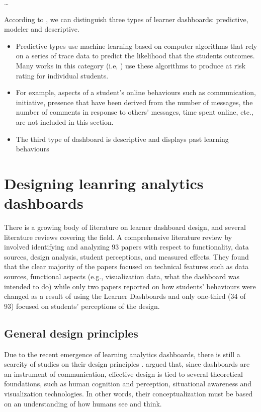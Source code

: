 \documentclass[preprint,12pt]{elsarticle}
\begin{document}
\dots


According to \citet{bennett2019four}, we can distinguish  three types of learner dashboards: predictive, modeler and descriptive. 
\begin{itemize}
    \item Predictive types use machine learning based on computer algorithms that rely on a series of trace data to predict the likelihood that the students outcomes. Many works in this category (i.e, \citep{arnold2014exercise}) use these algorithms to produce at risk rating for individual students.
    \item For example, aspects of a student's online behaviours such as communication, initiative, presence that have been derived from the number of messages, the number of comments in response to others' messages, time spent online, etc., are not included in this section. 
    \item The third type of dashboard is descriptive and displays past learning behaviours
\end{itemize}

\section{Designing leanring analytics dashboards}
There is a growing body of literature on learner dashboard design, and several literature reviews covering the field. A comprehensive literature review by \citet{bodily2017trends} involved identifying and analyzing 93 papers with respect to functionality, data sources, design analysis, student perceptions, and measured effects. They found that the clear majority of the papers focused on technical features such as data sources, functional aspects (e.g., visualization data, what the dashboard was intended to do) while only two papers reported on how students' behaviours were changed as a result of using the Learner Dashboards and only one-third (34 of 93) focused on students' perceptions of the design.
\subsection{General design principles}
Due to the recent emergence of learning analytics dashboards, there is still a scarcity of studies on their design principles \citep{Echeverria2018}. 
\citet{Yoo2015} argued that, since dashboards are an instrument of communication, effective design is tied to several theoretical foundations, such as human cognition and perception, situational awareness and visualization technologies. In other words, their conceptualization must be based on an understanding of how humans see and think. 
\end{document}
